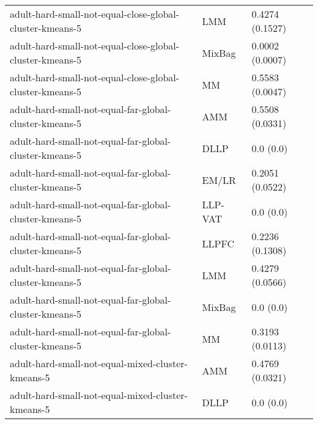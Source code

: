 \begin{longtable}{lll}
                                                     adult-hard-small-not-equal-close-global-cluster-kmeans-5 &       LMM &                       0.4274 (0.1527) \\
                                                     adult-hard-small-not-equal-close-global-cluster-kmeans-5 &    MixBag &                       0.0002 (0.0007) \\
                                                     adult-hard-small-not-equal-close-global-cluster-kmeans-5 &        MM &                       0.5583 (0.0047) \\
                                                       adult-hard-small-not-equal-far-global-cluster-kmeans-5 &       AMM &                       0.5508 (0.0331) \\
                                                       adult-hard-small-not-equal-far-global-cluster-kmeans-5 &      DLLP &                             0.0 (0.0) \\
                                                       adult-hard-small-not-equal-far-global-cluster-kmeans-5 &     EM/LR &                       0.2051 (0.0522) \\
                                                       adult-hard-small-not-equal-far-global-cluster-kmeans-5 &   LLP-VAT &                             0.0 (0.0) \\
                                                       adult-hard-small-not-equal-far-global-cluster-kmeans-5 &     LLPFC &                       0.2236 (0.1308) \\
                                                       adult-hard-small-not-equal-far-global-cluster-kmeans-5 &       LMM &                       0.4279 (0.0566) \\
                                                       adult-hard-small-not-equal-far-global-cluster-kmeans-5 &    MixBag &                             0.0 (0.0) \\
                                                       adult-hard-small-not-equal-far-global-cluster-kmeans-5 &        MM &                       0.3193 (0.0113) \\
                                                            adult-hard-small-not-equal-mixed-cluster-kmeans-5 &       AMM &                       0.4769 (0.0321) \\
                                                            adult-hard-small-not-equal-mixed-cluster-kmeans-5 &      DLLP &                             0.0 (0.0) \\

\end{longtable}
